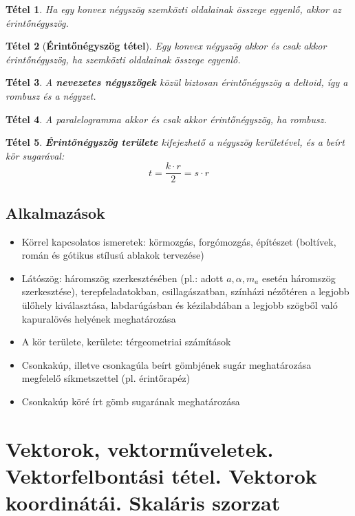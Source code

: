 \documentclass[12pt,a4paper]{article}
\newtheorem{theorem}{Tétel} [section]
\begin{document}
\begin{theorem}
Ha egy konvex négyszög szemközti oldalainak összege egyenlő, akkor az érintőnégyszög.
\end{theorem}

\begin{theorem}[\textbf{Érintőnégyszög tétel}]
Egy konvex négyszög akkor és csak akkor érintőnégyszög, ha szemközti oldalainak összege egyenlő.
\end{theorem}

\begin{theorem}
A \textbf{nevezetes négyszögek} közül biztosan érintőnégyszög a deltoid, így a rombusz és a négyzet.
\end{theorem}

\begin{theorem}
A paralelogramma akkor és csak akkor érintőnégyszög, ha rombusz.
\end{theorem}

\begin{theorem}
\textbf{Érintőnégyszög területe} kifejezhető a négyszög kerületével, és a beírt kör sugarával:
$$t=\dfrac{k\cdot r}{2}=s\cdot r$$
\end{theorem}

\subsection{Alkalmazások}
\begin{itemize}
\item  Körrel kapcsolatos ismeretek: körmozgás, forgómozgás, építészet (boltívek, román és gótikus stílusú ablakok tervezése)
\item Látószög: háromszög szerkesztésében (pl.: adott $a, \alpha , m_a$ esetén háromszög szerkesztése), terepfeladatokban, csillagászatban, színházi nézőtéren a legjobb ülőhely kiválasztása, labdarúgásban és kézilabdában a legjobb szögből való kapuralövés helyének meghatározása
\item A kör területe, kerülete: térgeometriai számítások
\item Csonkakúp, illetve csonkagúla beírt gömbjének sugár meghatározása megfelelő síkmetszettel (pl. érintőrapéz)
\item Csonkakúp köré írt gömb sugarának meghatározása
\end{itemize}
\newpage



\section{Vektorok, vektorműveletek. Vektorfelbontási tétel. Vektorok koordinátái. Skaláris szorzat}
\end{document}
